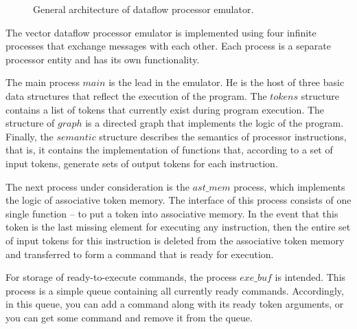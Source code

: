 \documentclass[
11pt,%
tightenlines,%
twoside,%
onecolumn,%
nofloats,%
nobibnotes,%
nofootinbib,%
superscriptaddress,%
noshowpacs,%
centertags]%
{revtex4}
\begin{document}
\begin{figure}[h!]
\caption{General architecture of dataflow
processor emulator.} \label{fig:big-scheme}
\end{figure}

The vector dataflow processor emulator is implemented using four infinite processes that exchange messages with each other.
Each process is a separate processor entity and has its own functionality.

The main process $main$ is the lead in the emulator.
He is the host of three basic data structures that reflect the execution of the program.
The $tokens$ structure contains a list of tokens that currently exist during program execution.
The structure of $graph$ is a directed graph that implements the logic of the program.
Finally, the $semantic$ structure describes the semantics of processor instructions, that is, it contains the implementation of functions that, according to a set of input tokens, generate sets of output tokens for each instruction.

The next process under consideration is the $ast\_mem$ process, which implements the logic of associative token memory.
The interface of this process consists of one single function -- to put a token into associative memory.
In the event that this token is the last missing element for executing any instruction, then the entire set of input tokens for this instruction is deleted from the associative token memory and transferred to form a command that is ready for execution.

For storage of ready-to-execute commands, the process $exe\_buf$ is intended.
This process is a simple queue containing all currently ready commands.
Accordingly, in this queue, you can add a command along with its ready token arguments, or you can get some command and remove it from the queue.
\end{document}
